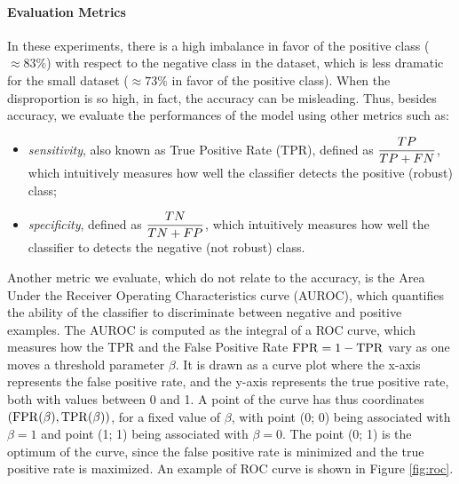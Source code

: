 \paragraph{Evaluation Metrics} In these experiments, there is a high imbalance in favor of the positive class ($\approx 83\%$) with respect to the negative class in the dataset, which is less dramatic for the small dataset ($\approx 73\%$ in favor of the positive class). When the disproportion is so high, in fact, the accuracy can be misleading. Thus, besides accuracy, we evaluate the performances of the model using other metrics such as:
\begin{itemize}
    \item \emph{sensitivity}, also known as True Positive Rate (TPR), defined as ${\displaystyle\frac{TP}{TP + FN}}$, which intuitively measures how well the classifier detects the positive (robust) class;
    \item \emph{specificity}, defined as ${\displaystyle\frac{TN}{TN + FP}}$, which intuitively measures how well the classifier to detects the negative (not robust) class.
\end{itemize}
Another metric we evaluate, which do not relate to the accuracy, is the Area Under the Receiver Operating Characteristics curve (AUROC), which quantifies the ability of the classifier to discriminate between negative and positive examples. The AUROC is computed as the integral of a ROC curve, which measures how the TPR and the False Positive Rate $\mathrm{FPR} = 1 - \mathrm{TPR}$ vary as one moves a threshold parameter $\beta$. It is drawn as a curve plot where the x-axis represents the false positive rate, and the y-axis represents the true positive rate, both with values between 0 and 1. A point of the curve has thus coordinates $(\mathrm{FPR}(\beta), \mathrm{TPR}(\beta))$, for a fixed value of $\beta$, with point (0; 0) being associated with $\beta = 1$ and point (1; 1) being associated with $\beta = 0$. The point (0; 1) is the optimum of the curve, since the false positive rate is minimized and the true positive rate is maximized. An example of ROC curve is shown in Figure \ref{fig:roc}.

